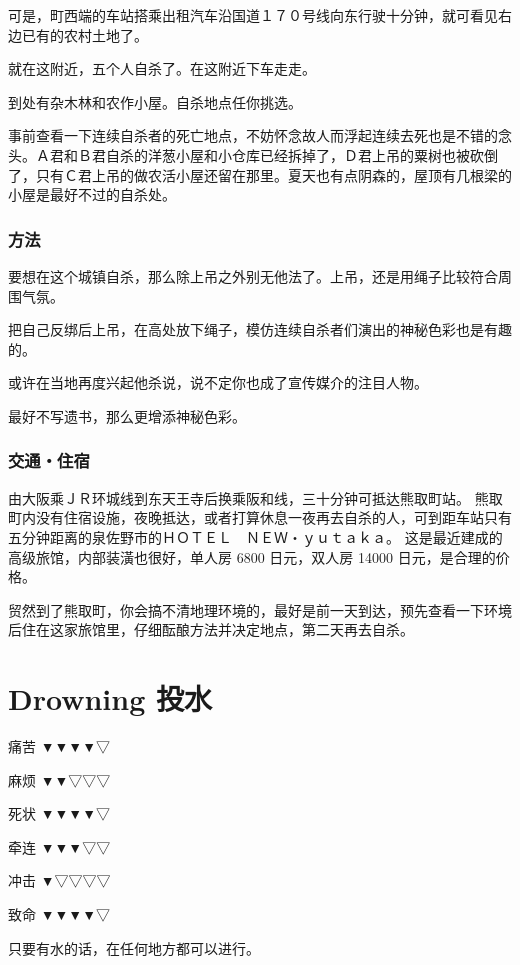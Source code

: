 \documentclass[UTF8]{ctexart}
\begin{document}
可是，町西端的车站搭乘出租汽车沿国道１７０号线向东行驶十分钟，就可看见右边已有的农村土地了。

就在这附近，五个人自杀了。在这附近下车走走。

到处有杂木林和农作小屋。自杀地点任你挑选。

事前查看一下连续自杀者的死亡地点，不妨怀念故人而浮起连续去死也是不错的念头。Ａ君和Ｂ君自杀的洋葱小屋和小仓库已经拆掉了，Ｄ君上吊的粟树也被砍倒了，只有Ｃ君上吊的做农活小屋还留在那里。夏天也有点阴森的，屋顶有几根梁的小屋是最好不过的自杀处。

\subsubsection*{方法}

要想在这个城镇自杀，那么除上吊之外别无他法了。上吊，还是用绳子比较符合周围气氛。

把自己反绑后上吊，在高处放下绳子，模仿连续自杀者们演出的神秘色彩也是有趣的。

或许在当地再度兴起他杀说，说不定你也成了宣传媒介的注目人物。

最好不写遗书，那么更增添神秘色彩。

\subsubsection*{交通‧住宿}

由大阪乘ＪＲ环城线到东天王寺后换乘阪和线，三十分钟可抵达熊取町站。
熊取町内没有住宿设施，夜晚抵达，或者打算休息一夜再去自杀的人，可到距车站只有五分钟距离的泉佐野市的ＨＯＴＥＬ　ＮＥＷ‧ｙｕｔａｋａ。
这是最近建成的高级旅馆，内部装潢也很好，单人房 6800 日元，双人房 14000 日元，是合理的价格。

贸然到了熊取町，你会搞不清地理环境的，最好是前一天到达，预先查看一下环境后住在这家旅馆里，仔细酝酿方法并决定地点，第二天再去自杀。

\newpage

\section{Drowning 投水}

痛苦 ▼▼▼▼▽

麻烦 ▼▼▽▽▽

死状 ▼▼▼▼▽

牵连 ▼▼▼▽▽

冲击 ▼▽▽▽▽

致命 ▼▼▼▼▽

只要有水的话，在任何地方都可以进行。
\end{document}
